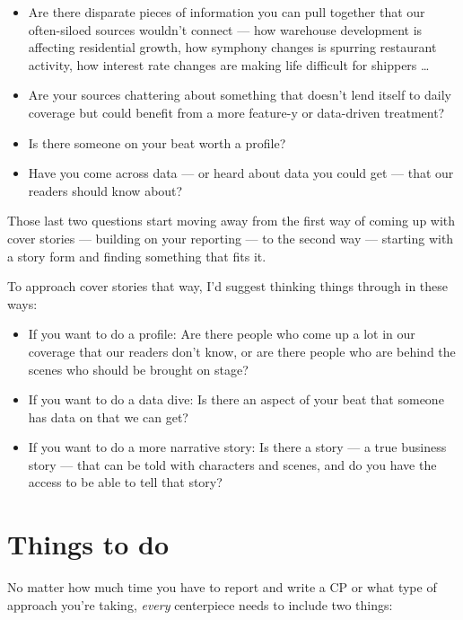 \documentclass[
  11pt,
  american,
  letterpaperpaper,
  extrafontsizes,onecolumn,openright
  ]{memoir}
\providecommand{\tightlist}{%
  \setlength{\itemsep}{0pt}\setlength{\parskip}{0pt}}
\begin{document}
\begin{itemize}
\item
  Are there disparate pieces of information you can pull together that our often-siloed sources wouldn't connect --- how warehouse development is affecting residential growth, how symphony changes is spurring restaurant activity, how interest rate changes are making life difficult for shippers \ldots{}
\item
  Are your sources chattering about something that doesn't lend itself to daily coverage but could benefit from a more feature-y or data-driven treatment?
\item
  Is there someone on your beat worth a profile?
\item
  Have you come across data --- or heard about data you could get --- that our readers should know about?
\end{itemize}

Those last two questions start moving away from the first way of coming up with cover stories --- building on your reporting --- to the second way --- starting with a story form and finding something that fits it.

To approach cover stories that way, I'd suggest thinking things through in these ways:

\begin{itemize}
\tightlist
\item
  If you want to do a profile: Are there people who come up a lot in our coverage that our readers don't know, or are there people who are behind the scenes who should be brought on stage?
\item
  If you want to do a data dive: Is there an aspect of your beat that someone has data on that we can get?
\item
  If you want to do a more narrative story: Is there a story --- a true business story --- that can be told with characters and scenes, and do you have the access to be able to tell that story?
\end{itemize}

\hypertarget{things-to-do}{%
\section*{Things to do}\label{things-to-do}}

No matter how much time you have to report and write a CP or what type of approach you're taking, \emph{every} centerpiece needs to include two things:
\end{document}
